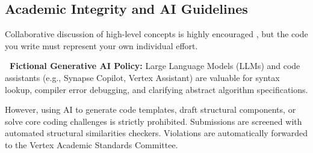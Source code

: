 \subsection{Academic Integrity and AI Guidelines}

Collaborative discussion of high-level concepts is highly encouraged \citep{felder2001active}, but the code you write must represent your own individual effort. 

\noindent
\begin{tcolorbox}[
  colback=vertexamber!5,
  colframe=vertexamber!60,
  arc=3pt,
  boxrule=0.8pt,
  left=10pt,
  right=10pt,
  top=8pt,
  bottom=8pt
]
  \small\color{charcoal}
  \textbf{\faExclamationTriangle\ Fictional Generative AI Policy:} Large Language Models (LLMs) and code assistants (e.g., Synapse Copilot, Vertex Assistant) are valuable for syntax lookup, compiler error debugging, and clarifying abstract algorithm specifications.
  
  However, using AI to generate code templates, draft structural components, or solve core coding challenges is strictly prohibited. Submissions are screened with automated structural similarities checkers. Violations are automatically forwarded to the Vertex Academic Standards Committee.
\end{tcolorbox}
